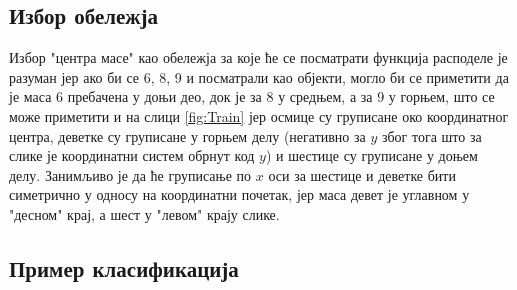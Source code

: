 \subsection{Избор обележја}
Избор "центра масе" као обележја за које ће се посматрати функција расподеле је разуман јер ако би се 6, 8, 9 и посматрали као објекти, могло би се приметити да је маса 6 пребачена у доњи део, док је за 8 у средњем, а за 9 у горњем, што се може приметити и на слици \ref{fig:Train} јер осмице су груписане око координатног центра, деветке су груписане у горњем делу (негативно за $y$ због тога што за слике је координатни систем обрнут код $y$) и шестице су груписане у доњем делу. Занимљиво је да ће груписање по $x$ оси за шестице и деветке бити симетрично у односу на координатни почетак, јер маса девет је углавном у "десном" крај, а шест у "левом" крају слике. 
\newpage
\subsection{Пример класификација}

